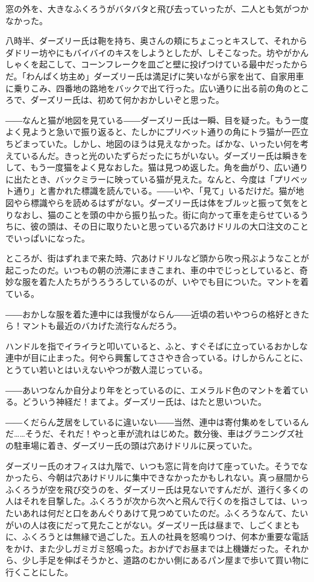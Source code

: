 \documentclass[10pt,a4paper]{article}
\begin{document}
\begin{CJK}{UTF8}{min}
窓の外を、大きなふくろうがバタバタと飛び去っていったが、二人とも気がつかなかった。

八時半、ダーズリー氏は鞄を持ち、奥さんの頬にちょこっとキスして、それからダドリー坊やにもバイバイのキスをしようとしたが、しそこなった。坊やがかんしゃくを起こして、コーンフレークを皿ごと壁に投げつけている最中だったからだ。「わんぱく坊主め」ダーズリー氏は満足げに笑いながら家を出て、自家用車に乗りこみ、四番地の路地をバックで出て行った。広い通りに出る前の角のところで、ダーズリー氏は、初めて何かおかしいぞと思った。

――なんと猫が地図を見ている――ダーズリー氏は一瞬、目を疑った。もう一度よく見ようと急いで振り返ると、たしかにプリベット通りの角にトラ猫が一匹立ちどまっていた。しかし、地図のほうは見えなかった。ばかな、いったい何を考えているんだ。きっと光のいたずらだったにちがいない。ダーズリー氏は瞬きをして、もう一度猫をよく見なおした。猫は見つめ返した。角を曲がり、広い通りに出たとき、バックミラーに映っている猫が見えた。なんと、今度は「プリベット通り」と書かれた標識を読んでいる。――いや、「見て」いるだけだ。猫が地図やら標識やらを読めるはずがない。ダーズリー氏は体をブルッと振って気をとりなおし、猫のことを頭の中から振り払った。街に向かって車を走らせているうちに、彼の頭は、その日に取りたいと思っている穴あけドリルの大口注文のことでいっぱいになった。

ところが、街はずれまで来た時、穴あけドリルなど頭から吹っ飛ぶようなことが起こったのだ。いつもの朝の渋滞にまきこまれ、車の中でじっとしていると、奇妙な服を着た人たちがうろうろしているのが、いやでも目についた。マントを着ている。

――おかしな服を着た連中には我慢がならん――近頃の若いやつらの格好ときたら！マントも最近のバカげた流行なんだろう。

ハンドルを指でイライラと叩いていると、ふと、すぐそばに立っているおかしな連中が目に止まった。何やら興奮してささやき合っている。けしからんことに、とうてい若いとはいえないやつが数人混じっている。

――あいつなんか自分より年をとっているのに、エメラルド色のマントを着ている。どういう神経だ！まてよ。ダーズリー氏は、はたと思いついた。

――くだらん芝居をしているに違いない――当然、連中は寄付集めをしているんだ……そうだ、それだ！やっと車が流れはじめた。数分後、車はグラニングズ社の駐車場に着き、ダーズリー氏の頭は穴あけドリルに戻っていた。

ダーズリー氏のオフィスは九階で、いつも窓に背を向けて座っていた。そうでなかったら、今朝は穴あけドリルに集中できなかったかもしれない。真っ昼間からふくろうが空を飛び交うのを、ダーズリー氏は見ないですんだが、道行く多くの人はそれを目撃した。ふくろうが次から次へと飛んで行くのを指さしては、いったいあれは何だと口をあんぐりあけて見つめていたのだ。ふくろうなんて、たいがいの人は夜にだって見たことがない。ダーズリー氏は昼まで、しごくまともに、ふくろうとは無縁で過ごした。五人の社員を怒鳴りつけ、何本か重要な電話をかけ、また少しガミガミ怒鳴った。おかげでお昼までは上機嫌だった。それから、少し手足を伸ばそうかと、道路のむかい側にあるパン屋まで歩いて買い物に行くことにした。


\end{CJK}
\end{document}
